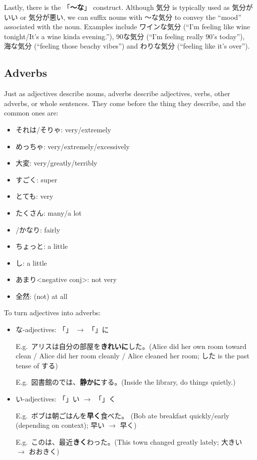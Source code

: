 \documentclass[../nihongo-gakushuu-kyouzai.tex]{subfiles}
\begin{document}
Lastly, there is the 「\textbf{〜な}」 construct. Although 気分 is typically used as 気分がいい or 気分が悪い, we can suffix nouns with 〜な気分 to convey the ``mood'' associated with the noun. Examples include ワインな気分 (``I'm feeling like wine tonight/It's a wine kinda evening.''), 90な気分 (``I'm feeling really 90's today''), 海な気分 (``feeling those beachy vibes'') and わりな気分 (``feeling like it's over'').



\subsection{Adverbs} \label{sec:adverb}
Just as adjectives describe nouns, adverbs describe adjectives, verbs, other adverbs, or whole sentences. They come before the thing they describe, and the common ones are:
\begin{itemize}
    \item それは/そりゃ: very/extremely
    \item めっちゃ: very/extremely/excessively
    \item 大変: very/greatly/terribly
    \item すごく: super
    \item とても: very
    \item たくさん: many/a lot
    \item {}/かなり: fairly
    \item ちょっと: a little
    \item {}し: a little
    \item あまり<negative conj>: not very
    \item 全然: (not) at all
\end{itemize}

To turn adjectives into adverbs:
\begin{itemize}
    \item な-adjectives: 「」 $\to$ 「」に

    E.g.\ アリスは自分の部屋を\textbf{きれいに}した。(Alice did her own room toward clean / Alice did her room cleanly / Alice cleaned her room; した is the past tense of する)

    E.g.\ 図書館のでは、\textbf{静かに}する。(Inside the library, do things quietly.)
    \item い-adjectives: 「」い $\to$ 「」く

    E.g.\ ボブは朝ごはんを\textbf{早く}食べた。 (Bob ate breakfast quickly/early (depending on context); 早い $\to$ 早く)

    E.g.\ このは、最近\textbf{きく}わった。(This town changed greatly lately; 大きい $\to$ おおきく)
\end{itemize}
\end{document}
